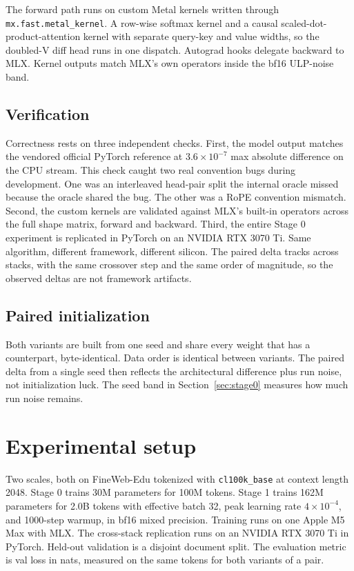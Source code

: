 The forward path runs on custom Metal kernels written through
\texttt{mx.fast.metal\_kernel}. A row-wise softmax kernel and a causal
scaled-dot-product-attention kernel with separate query-key and value
widths, so the doubled-V diff head runs in one dispatch. Autograd hooks
delegate backward to MLX. Kernel outputs match MLX's own operators
inside the bf16 ULP-noise band.

\subsection{Verification}
Correctness rests on three independent checks. First, the model output
matches the vendored official PyTorch reference at $3.6 \times 10^{-7}$
max absolute difference on the CPU stream. This check caught two real
convention bugs during development. One was an interleaved head-pair split the internal oracle missed because the oracle shared the bug. The other was a RoPE convention mismatch. Second, the custom kernels are validated against
MLX's built-in operators across the full shape matrix, forward and
backward. Third, the entire Stage 0 experiment is replicated in PyTorch
on an NVIDIA RTX 3070 Ti. Same algorithm, different framework,
different silicon. The paired delta tracks across stacks, with the same
crossover step and the same order of magnitude, so the observed deltas
are not framework artifacts.

\subsection{Paired initialization}
Both variants are built from one seed and share every weight that has a
counterpart, byte-identical. Data order is identical between variants.
The paired delta from a single seed then reflects the architectural
difference plus run noise, not initialization luck. The seed band in
Section~\ref{sec:stage0} measures how much run noise remains.

\section{Experimental setup}
Two scales, both on FineWeb-Edu\supercite{penedo2024fineweb} tokenized
with \texttt{cl100k\_base} at context length 2048. Stage 0 trains 30M
parameters for 100M tokens. Stage 1 trains 162M parameters for 2.0B
tokens with effective batch 32, peak learning rate $4 \times 10^{-4}$,
and 1000-step warmup, in bf16 mixed precision. Training runs on one
Apple M5 Max with MLX. The cross-stack replication runs on an NVIDIA
RTX 3070 Ti in PyTorch. Held-out validation is a disjoint document
split. The evaluation metric is val loss in nats, measured on the same
tokens for both variants of a pair.

